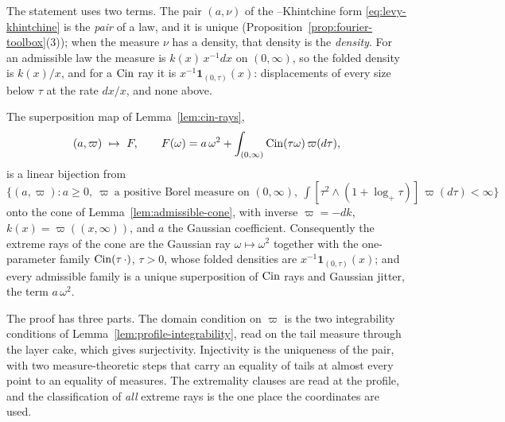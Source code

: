 The statement uses two terms. The pair $(a,\nu)$ of the \Levy--Khintchine form
\ref{eq:levy-khintchine} is the \emph{\Levy{} pair} of a law, and it is unique
(Proposition~\ref{prop:fourier-toolbox}(3)); when the \Levy{} measure $\nu$ has a density,
that density is the \emph{\Levy{} density}. For an admissible law the \Levy{} measure is
$k(x)\,x^{-1}dx$ on $(0,\infty)$, so the folded \Levy{} density is $k(x)/x$, and for a $\operatorname{Cin}$
ray it is $x^{-1}\mathbf 1_{(0,\tau)}(x)$: displacements of every size below $\tau$ at the
rate $dx/x$, and none above.

\begin{proposition}\label{prop:choquet-cone}
The superposition map of Lemma~\ref{lem:cin-rays},
\[
  (a,\varpi) \ \mapsto\ F, \qquad
  F(\omega) = a\,\omega^2 + \int_{(0,\infty)} \operatorname{Cin}(\tau\omega)\,\varpi(d\tau),
\]
is a linear bijection from
$\bigl\{(a,\varpi) : a \ge 0,\ \varpi \ \text{a positive Borel measure on } (0,\infty),\
\int [\tau^2 \wedge (1 + \log_+\tau)]\,\varpi(d\tau) < \infty\bigr\}$
onto the cone of Lemma~\ref{lem:admissible-cone}, with inverse $\varpi = -dk$, $k(x) =
\varpi((x,\infty))$, and $a$ the Gaussian coefficient. Consequently the extreme rays of the
cone are the Gaussian ray $\omega \mapsto \omega^2$ together with the one-parameter family
$\operatorname{Cin}(\tau\,\cdot)$, $\tau > 0$, whose folded \Levy{} densities are
$x^{-1}\mathbf 1_{(0,\tau)}(x)$; and every admissible family is a unique superposition of
$\operatorname{Cin}$ rays and Gaussian jitter, the term $a\,\omega^2$.
\end{proposition}



The proof has three parts. The domain condition on $\varpi$ is the two integrability
conditions of Lemma~\ref{lem:profile-integrability}, read on the tail measure through the
layer cake, which gives surjectivity. Injectivity is the uniqueness of the \Levy{} pair, with
two measure-theoretic steps that carry an equality of tails at almost every point to an
equality of measures. The extremality clauses are read at the profile, and the classification
of \emph{all} extreme rays is the one place the coordinates are used.

